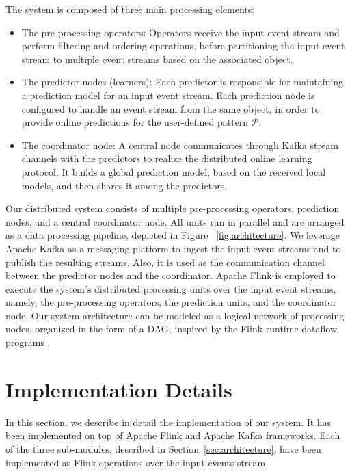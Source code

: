 The system is composed of three main processing elements:   
\begin{itemize}
	
	\item The pre-processing operators: Operators receive the input event stream and perform filtering and ordering operations, before partitioning the input event stream to multiple event streams based on the associated object. 
	\item The predictor nodes (learners): Each predictor is responsible for maintaining a prediction model for an input event stream. Each prediction node is configured to handle an event stream from the same  object, in order to provide online predictions for the user-defined pattern $\mathcal{P}$.  
	\item The coordinator node:  A central node communicates through Kafka stream channels with the predictors to realize the distributed online learning protocol. It builds a global prediction model, based on the received local models, and then shares it among the predictors.
\end{itemize}

\par Our distributed system consists of multiple pre-processing operators, prediction nodes, and a central coordinator node. All units run in parallel and are arranged as a data processing pipeline, depicted in Figure ~\ref{fig:architecture}. We leverage Apache Kafka as a messaging platform to ingest the input event streams and to publish the resulting streams. Also, it is used as the communication channel between the predictor nodes and the coordinator. Apache Flink is employed to execute the system's distributed processing units over the input event streams, namely, the pre-processing operators,  the prediction units, and the coordinator node. Our system architecture can be modeled as a logical network of processing nodes, organized in the form of a DAG, inspired by the Flink runtime dataflow programs \cite{carbone2015apache}. 

\section{Implementation Details}
\label{sec:impl}
In this section, we describe in detail the implementation of our system. It has been implemented on top of Apache Flink and Apache Kafka frameworks. Each of the three sub-modules, described in Section~\ref{sec:architecture}, have been implemented as Flink operations over the input events stream. 

